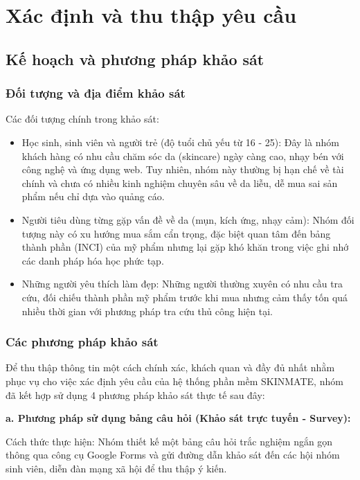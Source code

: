 \documentclass[12pt,a4paper]{article}
\begin{document}
\section{Xác định và thu thập yêu cầu}

\subsection{Kế hoạch và phương pháp khảo sát}

\subsubsection{Đối tượng và địa điểm khảo sát}

Các đối tượng chính trong khảo sát:
\begin{itemize}
    \item Học sinh, sinh viên và người trẻ (độ tuổi chủ yếu từ 16 - 25): Đây là nhóm khách hàng có nhu cầu chăm sóc da (skincare) ngày càng cao, nhạy bén với công nghệ và ứng dụng web. Tuy nhiên, nhóm này thường bị hạn chế về tài chính và chưa có nhiều kinh nghiệm chuyên sâu về da liễu, dễ mua sai sản phẩm nếu chỉ dựa vào quảng cáo.
    \item Người tiêu dùng từng gặp vấn đề về da (mụn, kích ứng, nhạy cảm): Nhóm đối tượng này có xu hướng mua sắm cẩn trọng, đặc biệt quan tâm đến bảng thành phần (INCI) của mỹ phẩm nhưng lại gặp khó khăn trong việc ghi nhớ các danh pháp hóa học phức tạp.
    \item Những người yêu thích làm đẹp: Những người thường xuyên có nhu cầu tra cứu, đối chiếu thành phần mỹ phẩm trước khi mua nhưng cảm thấy tốn quá nhiều thời gian với phương pháp tra cứu thủ công hiện tại.
\end{itemize}

\subsubsection{Các phương pháp khảo sát}

Để thu thập thông tin một cách chính xác, khách quan và đầy đủ nhất nhằm phục vụ cho việc xác định yêu cầu của hệ thống phần mềm SKINMATE, nhóm đã kết hợp sử dụng 4 phương pháp khảo sát thực tế sau đây:

\textbf{a. Phương pháp sử dụng bảng câu hỏi (Khảo sát trực tuyến - Survey):}

Cách thức thực hiện: Nhóm thiết kế một bảng câu hỏi trắc nghiệm ngắn gọn thông qua công cụ Google Forms và gửi đường dẫn khảo sát đến các hội nhóm sinh viên, diễn đàn mạng xã hội để thu thập ý kiến.
\end{document}
